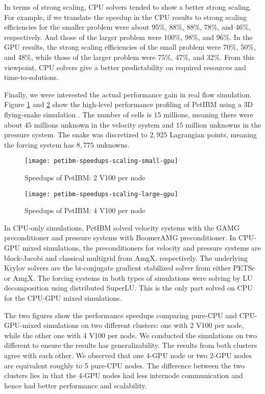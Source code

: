 In terms of strong scaling, CPU solvers tended to show a better strong scaling.
For example, if we translate the speedup in the CPU results to strong scaling efficiencies for the smaller problem were about 95\%, 88\%, 88\%, 78\%, and 46\%, respectively.
And those of the larger problem were 100\%, 98\%, and 96\%.
In the GPU results, the strong scaling efficiencies of the small problem were 70\%, 50\%, and 48\%, while those of the larger problem were 75\%, 47\%, and 32\%.
From this viewpoint, CPU solvers give a better predictability on required resources and time-to-solutions. 

Finally, we were interested the actual performance gain in real flow simulation.
Figure \ref{fig:petibm-speedups-15M-small} and \ref{fig:petibm-speedups-15M-large} show the high-level performance profiling of PetIBM using a 3D flying-snake simulation \cite{krishnan_lift_2014,krishnan_cuibm_2017}.
The number of cells is $15$ millions, meaning there were about $45$ millions unknown in the velocity system and $15$ million unknowns in the pressure system.
The snake was discretized to $2,925$ Lagrangian points, meaning the forcing system has $8,775$ unknowns.

\begin{figure}[H]
    \texttt{[image: petibm-speedups-scaling-small-gpu]}
    \caption{Speedups of PetIBM: 2 V100 per node}
    \label{fig:petibm-speedups-15M-small}
\end{figure}

\begin{figure}[H]
    \texttt{[image: petibm-speedups-scaling-large-gpu]}
    \caption{Speedups of PetIBM: 4 V100 per node}
    \label{fig:petibm-speedups-15M-large}
\end{figure}

In CPU-only simulations, PetIBM solved velocity systems with the GAMG preconditioner and pressure systems with BoomerAMG preconditioner.
In CPU-GPU mixed simulations, the preconditioners for velocity and pressure systems are block-Jacobi and classical multigrid from AmgX, respectively.
The underlying Krylov solvers are the bi-conjugate gradient stabilized solver from either PETSc or AmgX.
The forcing systems in both types of simulations were solving by LU decomposition using distributed SuperLU.
This is the only part solved on CPU for the CPU-GPU mixed simulations.

The two figures show the performance speedups comparing pure-CPU and CPU-GPU-mixed simulations on two different clusters: one with 2 V100 per node, while the other one with 4 V100 per node.
We conducted the simulations on two different to ensure the results has generalizability.
The results from both clusters agree with each other.
We observed that one 4-GPU node or two 2-GPU nodes are equivalent roughly to 5 pure-CPU nodes.
The difference between the two clusters lies in that the 4-GPU nodes had less internode communication and hence had better performance and scalability.
